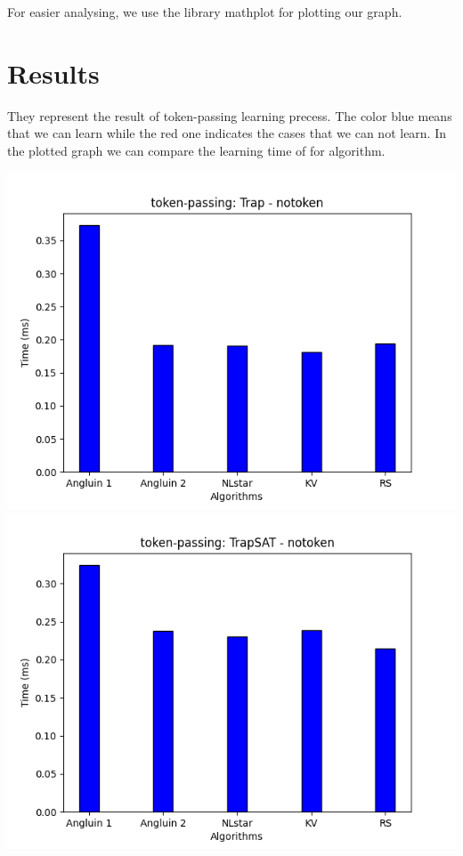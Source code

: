 For easier analysing, we use the library mathplot for 
plotting our graph.

\section{Results}
They represent the result of token-passing learning precess.
The color blue means that we can learn while the red one 
indicates the cases that we can not learn.
In the plotted graph we can compare the learning time of for 
algorithm.

\includegraphics[scale=0.5]{figures/Trap_notoken.png}
\includegraphics[scale=0.5]{figures/TrapSAT_notoken.png}

